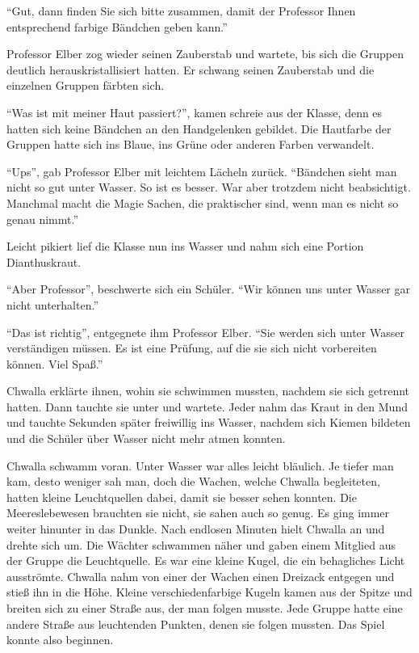 \enquote{Gut, dann finden Sie sich bitte zusammen, damit der Professor Ihnen entsprechend farbige Bändchen geben kann.}

Professor Elber zog wieder seinen Zauberstab und wartete, bis sich die Gruppen deutlich herauskristallisiert hatten. Er schwang seinen Zauberstab und die einzelnen Gruppen färbten sich.

\enquote{Was ist mit meiner Haut passiert?}, kamen schreie aus der Klasse, denn es hatten sich keine Bändchen an den Handgelenken gebildet. Die Hautfarbe der Gruppen hatte sich ins Blaue, ins Grüne oder anderen Farben verwandelt.

\enquote{Ups}, gab Professor Elber mit leichtem Lächeln zurück. \enquote{Bändchen sieht man nicht so gut unter Wasser. So ist es besser. War aber trotzdem nicht beabsichtigt. Manchmal macht die Magie Sachen, die praktischer sind, wenn man es nicht so genau nimmt.}

Leicht pikiert lief die Klasse nun ins Wasser und nahm sich eine Portion Dianthuskraut.

\enquote{Aber Professor}, beschwerte sich ein Schüler. \enquote{Wir können uns unter Wasser gar nicht unterhalten.}

\enquote{Das ist richtig}, entgegnete ihm Professor Elber. \enquote{Sie werden sich unter Wasser verständigen müssen. Es ist eine Prüfung, auf die sie sich nicht vorbereiten können. Viel Spaß.}

Chwalla erklärte ihnen, wohin sie schwimmen mussten, nachdem sie sich getrennt hatten. Dann tauchte sie unter und wartete. Jeder nahm das Kraut in den Mund und tauchte Sekunden später freiwillig ins Wasser, nachdem sich Kiemen bildeten und die Schüler über Wasser nicht mehr atmen konnten.

Chwalla schwamm voran. Unter Wasser war alles leicht bläulich. Je tiefer man kam, desto weniger sah man, doch die Wachen, welche Chwalla begleiteten, hatten kleine Leuchtquellen dabei, damit sie besser sehen konnten. Die Meereslebewesen brauchten sie nicht, sie sahen auch so genug. Es ging immer weiter hinunter in das Dunkle. Nach endlosen Minuten hielt Chwalla an und drehte sich um. Die Wächter schwammen näher und gaben einem Mitglied aus der Gruppe die Leuchtquelle. Es war eine kleine Kugel, die ein behagliches Licht ausströmte. Chwalla nahm von einer der Wachen einen Dreizack entgegen und stieß ihn in die Höhe. Kleine verschiedenfarbige Kugeln kamen aus der Spitze und breiten sich zu einer Straße aus, der man folgen musste. Jede Gruppe hatte eine andere Straße aus leuchtenden Punkten, denen sie folgen mussten. Das Spiel konnte also beginnen.


